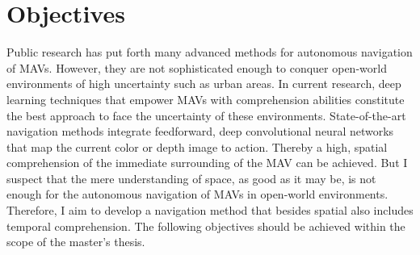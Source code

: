 \chapter{Objectives}\label{cha:objectives}

Public research has put forth many advanced methods for autonomous navigation of MAVs.
However, they are not sophisticated enough to conquer open-world environments of high uncertainty
such as urban areas. \cite{loquercio2018learning}
In current research, deep learning techniques that empower MAVs with comprehension abilities
constitute the best approach to face the uncertainty of these environments.
State-of-the-art navigation methods 
integrate feedforward, deep convolutional neural networks
that map the current color or depth image to action.
Thereby a high, spatial comprehension
of the immediate surrounding of the MAV can be achieved.
But I suspect that the mere understanding of space, as good as it may be,
is not enough for the autonomous navigation of MAVs
in open-world environments.
Therefore, I aim to develop a navigation method that besides spatial also includes temporal comprehension.
The following objectives should be achieved within the scope of the master's thesis.


